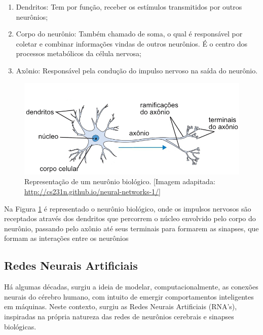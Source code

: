 \begin{enumerate}[label={\alph*)}]
    \item Dendritos: Tem por função, receber os estímulos transmitidos por outros neurônios;
    \item Corpo do neurônio: Também chamado de soma, o qual é responsável por coletar e combinar informações vindas de outros neurônios. É o centro dos processos metabólicos da célula nervosa;
    \item Axônio: Responsável pela condução do impulso nervoso na saída do neurônio.
\end{enumerate}

\begin{figure}[ht]
\centering
\includegraphics[width=1\textwidth]{figuras/neuronio.png}
\caption{Representação de um neurônio biológico. [Imagem adapitada: \href{http://cs231n.github.io/neural-networks-1/}{http://cs231n.github.io/neural-networks-1/}]}
\label{figneuroniobiologico}
\end{figure}

Na  Figura  \ref{figneuroniobiologico} é representado o neurônio biológico, onde os impulsos nervosos são receptados através dos dendritos que percorrem o núcleo envolvido pelo corpo do neurônio, passando pelo axônio até seus terminais para formarem as sinapses, que formam as interações entre os neurônios \cite{haykin2007redes}

\subsection{Redes Neurais Artificiais}

Há algumas décadas, surgiu a ideia de modelar, computacionalmente, as conexões neurais do cérebro humano, com intuito de emergir comportamentos inteligentes em máquinas. Neste contexto, surgiu as Redes Neurais Artificiais (RNA's), inspiradas na própria natureza das redes de neurônios cerebrais e sinapses biológicas.

